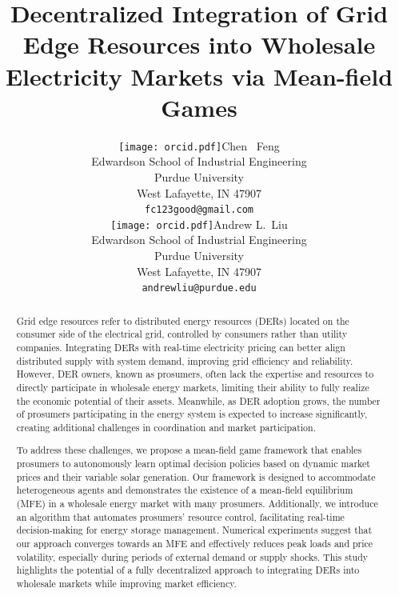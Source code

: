 \documentclass{article}
\title{Decentralized Integration of Grid Edge Resources into Wholesale Electricity Markets via Mean-field Games}
\date{} 					%
\author{ {\texttt{[image: orcid.pdf]}\hspace{1mm}Chen ~Feng}\\
	Edwardson School of Industrial Engineering\\
	Purdue University\\
	West Lafayette, IN 47907 \\
	\texttt{fc123good@gmail.com} \\
	\And
    {\texttt{[image: orcid.pdf]}\hspace{1mm}Andrew L.~Liu} \\
	Edwardson School of Industrial Engineering\\
	Purdue University\\
	West Lafayette, IN 47907 \\
	\texttt{andrewliu@purdue.edu} \\
}
\theoremstyle{definition}
\theoremstyle{plain}
\begin{document}
\maketitle
\begin{abstract}
	Grid edge resources refer to distributed energy resources (DERs) located on the consumer side of the electrical grid, controlled by consumers rather than utility companies. Integrating DERs with real-time electricity pricing can better align distributed supply with system demand, improving grid efficiency and reliability. 
However, DER owners, known as prosumers, often lack the expertise and resources to directly participate in wholesale energy markets, limiting their ability to fully realize the economic potential of their assets. Meanwhile, as DER adoption grows, the number of prosumers participating in the energy system is expected to increase significantly, creating additional challenges in coordination and market participation. 

To address these challenges, we propose a mean-field game framework that enables prosumers to autonomously learn optimal decision policies based on dynamic market prices and their variable solar generation. Our framework is designed to accommodate heterogeneous agents and demonstrates the existence of a mean-field equilibrium (MFE) in a wholesale energy market with many prosumers. Additionally, we introduce an algorithm that automates prosumers' resource control, facilitating real-time decision-making for energy storage management. Numerical experiments suggest that our approach converges towards an MFE and effectively reduces peak loads and price volatility, especially during periods of external demand or supply shocks. This study highlights the potential of a fully decentralized approach to integrating DERs into wholesale markets while improving market efficiency.
\end{abstract}




\end{document}
